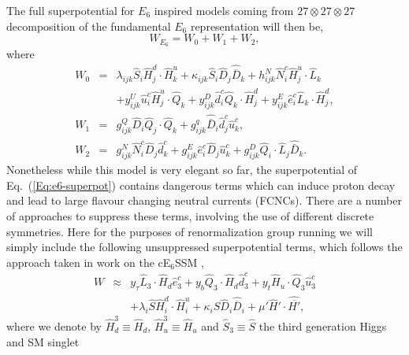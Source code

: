 \documentclass[preprint,amsmath,amssymb,aps,superscriptaddress,prd,
showpacs,floatfix,nofootinbib]{revtex4-1}
\newcommand{\be}{\begin{equation}}
\newcommand{\ee}{\end{equation}}
\newcommand{\ba}{\begin{eqnarray}}
\newcommand{\ea}{\end{eqnarray}}
\newcommand{\SuperField}[1]{\hat{#1}}
\begin{document}
The full superpotential for $E_6$ inspired models coming from $27\otimes 27 \otimes 27$ decomposition of the fundamental $E_6$ representation will then be,
\be
W_{E_6} = W_0 + W_1 + W_2 , \label{Eq:e6-superpot}
\ee
where
\begin{eqnarray}
W_0 &=& \lambda_{ijk} \hat{S}_i \hat{H}^d_{j} \cdot\hat{H}^u_{k} +
\kappa_{ijk} \hat{S}_i \hat{D}_j \hat{\overline{D}}_k + h^N_{ijk} \hat{N}^c_i
\hat{H}^u_{j} \cdot \hat{L}_k \nonumber \\
& & + y^U_{ijk} \hat{u}^c_i \hat{H}^u_{j} \cdot \hat{Q}_k + y^D_{ijk}
\hat{d}^c_i \hat{Q}_k \cdot \hat{H}^d_{j} + y^E_{ijk} \hat{e}^c_i \hat{L}_k
\cdot\hat{H}^d_{j} , \\
W_1 &=& g^Q_{ijk} \hat{D}_i \hat{Q}_j \cdot \hat{Q}_k + g^q_{ijk}
\hat{\bar{D}}_i \hat{d}^c_j \hat{u}^c_k , \\
W_2 &=& g^N_{ijk} \hat{N}^c_i \hat{D}_j \hat{d}^c_k + g^E_{ijk} \hat{e}^c_i
\hat{D}_j \hat{u}^c_k + g^D_{ijk} \hat{Q}_i \cdot \hat{L}_j \hat{\bar{D}}_k .
\label{Eq:e6-superpot-parts}
\end{eqnarray}
Nonetheless while this model is very elegant so far, the
superpotential of Eq.~(\ref{Eq:e6-superpot}) contains dangerous terms which
can induce proton decay and lead to large flavour changing neutral
currents (FCNCs).  There are a number of approaches to suppress these
terms, involving the use of different discrete symmetries.  Here for
the purposes of renormalization group running we will simply include
the following unsuppressed superpotential terms, which follows the
approach taken in work on the cE$_6$SSM \cite{Athron:2009ue, Athron:2009bs},
%
    \ba
    W &\approx& y_{\tau} \SuperField{L}_3 \cdot \SuperField{H}_d
      \SuperField{e}^c_3 + y_b \SuperField{Q}_3\cdot\SuperField{H}_d
      \SuperField{d}_3^c + y_t \SuperField{H}_u\cdot\SuperField{Q}_3
      \SuperField{u}_3^c\nonumber\\
    &&
    + \lambda_i \SuperField{S} \SuperField{H}_i^d
    \cdot \SuperField{H}_i^u  + \kappa_i \SuperField{S} \SuperField{D}_i
    \SuperField{\overline{D}}_i + \mu' \SuperField{H}'\cdot
    \SuperField{\overline{H'}},
    \ea
  \label{SuPot_RGE}
%
where we denote by $\SuperField{H}_d^3 \equiv \SuperField{H}_d$,
$\SuperField{H}_u^3 \equiv \SuperField{H}_u$ and $\SuperField{S}_3
\equiv \SuperField{S}$ the third generation Higgs and SM singlet
\end{document}
